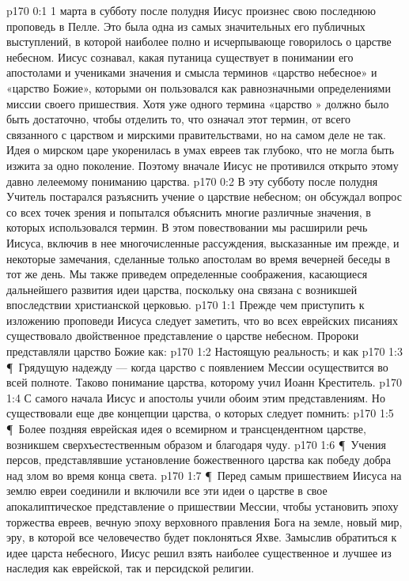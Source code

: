 \vs p170 0:1 1 марта в субботу после полудня Иисус произнес свою последнюю проповедь в Пелле. Это была одна из самых значительных его публичных выступлений, в которой наиболее полно и исчерпывающе говорилось о царстве небесном. Иисус сознавал, какая путаница существует в понимании его апостолами и учениками значения и смысла терминов «царство небесное» и «царство Божие», которыми он пользовался как равнозначными определениями миссии своего пришествия. Хотя уже одного термина «царство  » должно было быть достаточно, чтобы отделить то, что означал этот термин, от всего связанного с  царством и мирскими правительствами, но на самом деле не так. Идея о мирском царе укоренилась в умах евреев так глубоко, что не могла быть изжита за одно поколение. Поэтому вначале Иисус не противился открыто этому давно лелеемому пониманию царства.
\vs p170 0:2 В эту субботу после полудня Учитель постарался разъяснить учение о царствие небесном; он обсуждал вопрос со всех точек зрения и попытался объяснить многие различные значения, в которых использовался термин. В этом повествовании мы расширили речь Иисуса, включив в нее многочисленные рассуждения, высказанные им прежде, и некоторые замечания, сделанные только апостолам во время вечерней беседы в тот же день. Мы также приведем определенные соображения, касающиеся дальнейшего развития идеи царства, поскольку она связана с возникшей впоследствии христианской церковью.
\vs p170 1:1 Прежде чем приступить к изложению проповеди Иисуса следует заметить, что во всех еврейских писаниях существовало двойственное представление о царстве небесном. Пророки представляли царство Божие как:
\vs p170 1:2 \bibnobreakspace Настоящую реальность; и как
\vs p170 1:3 \P\ \bibnobreakspace Грядущую надежду --- когда царство с появлением Мессии осуществится во всей полноте. Таково понимание царства, которому учил Иоанн Креститель.
\vs p170 1:4 С самого начала Иисус и апостолы учили обоим этим представлениям. Но существовали еще две концепции царства, о которых следует помнить:
\vs p170 1:5 \P\ \bibnobreakspace Более поздняя еврейская идея о всемирном и трансцендентном царстве, возникшем сверхъестественным образом и благодаря чуду.
\vs p170 1:6 \P\ \bibnobreakspace Учения персов, представлявшие установление божественного царства как победу добра над злом во время конца света.
\vs p170 1:7 \P\ Перед самым пришествием Иисуса на землю евреи соединили и включили все эти идеи о царстве в свое апокалиптическое представление о пришествии Мессии, чтобы установить эпоху торжества евреев, вечную эпоху верховного правления Бога на земле, новый мир, эру, в которой все человечество будет поклоняться Яхве. Замыслив обратиться к идее царста небесного, Иисус решил взять наиболее существенное и лучшее из наследия как еврейской, так и персидской религии.
